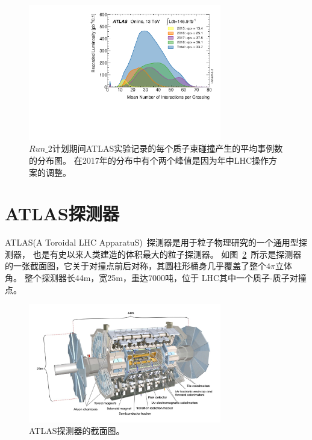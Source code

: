 \begin{figure}
  \begin{center}
    \includegraphics[width=0.75\textwidth]{figuresEXP/LHC3.pdf}
  \end{center}
  \caption{
  $Run\_2$计划期间ATLAS实验记录的每个质子束碰撞产生的平均事例数的分布图。
  在2017年的分布中有个两个峰值是因为年中LHC操作方案的调整。
    }
    \label{fig:LHC3}
\end{figure}


\section{ATLAS探测器}
\label{sec:ATLAS}

ATLAS(A Toroidal LHC ApparatuS)~\cite{PERF-2007-01,ATLASPERF1,ATLASPERF2}探测器是用于粒子物理研究的一个通用型探测器，
也是有史以来人类建造的体积最大的粒子探测器。
如图~\ref{fig:ATLAS1}~所示是探测器的一张截面图，它关于对撞点前后对称，其圆柱形桶身几乎覆盖了整个$4\pi$立体角。
整个探测器长44m，宽25m，重达7000吨，位于
LHC其中一个质子-质子对撞点。

\begin{figure}
  \begin{center}
    \includegraphics[width=0.75\textwidth]{figuresEXP/ATLAS1.jpg}
  \end{center}
  \caption{
ATLAS探测器的截面图。
  }
    \label{fig:ATLAS1}
\end{figure}

